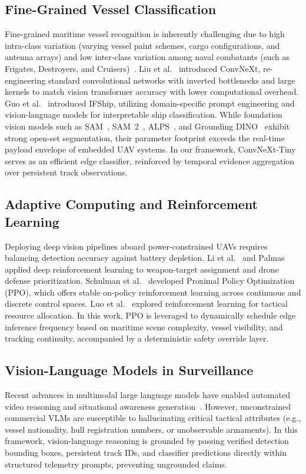 \documentclass[conference]{IEEEtran}
\begin{document}
\subsection{Fine-Grained Vessel Classification}
Fine-grained maritime vessel recognition is inherently challenging due to high intra-class variation (varying vessel paint schemes, cargo configurations, and antenna arrays) and low inter-class variation among naval combatants (such as Frigates, Destroyers, and Cruisers)~\cite{guo2026}. Liu et al.~\cite{liu2022convnet} introduced ConvNeXt, re-engineering standard convolutional networks with inverted bottlenecks and large kernels to match vision transformer accuracy with lower computational overhead. Guo et al.~\cite{guo2026} introduced IFShip, utilizing domain-specific prompt engineering and vision-language models for interpretable ship classification. While foundation vision models such as SAM~\cite{kirillov2023sam}, SAM~2~\cite{ravi2024sam2}, ALPS~\cite{zhang2025alps}, and Grounding DINO~\cite{liu2024groundingdino} exhibit strong open-set segmentation, their parameter footprint exceeds the real-time payload envelope of embedded UAV systems. In our framework, ConvNeXt-Tiny serves as an efficient edge classifier, reinforced by temporal evidence aggregation over persistent track observations.

\subsection{Adaptive Computing and Reinforcement Learning}
Deploying deep vision pipelines aboard power-constrained UAVs requires balancing detection accuracy against battery depletion. Li et al.~\cite{li2023drl} and Palmas~\cite{palmas2025} applied deep reinforcement learning to weapon-target assignment and drone defense prioritization. Schulman et al.~\cite{schulman2017ppo} developed Proximal Policy Optimization (PPO), which offers stable on-policy reinforcement learning across continuous and discrete control spaces. Luo et al.~\cite{luo2022} explored reinforcement learning for tactical resource allocation. In this work, PPO is leveraged to dynamically schedule edge inference frequency based on maritime scene complexity, vessel visibility, and tracking continuity, accompanied by a deterministic safety override layer.

\subsection{Vision-Language Models in Surveillance}
Recent advances in multimodal large language models have enabled automated video reasoning and situational awareness generation~\cite{desilva2024,feng2024}. However, unconstrained commercial VLMs are susceptible to hallucinating critical tactical attributes (e.g., vessel nationality, hull registration numbers, or unobservable armaments). In this framework, vision-language reasoning is grounded by passing verified detection bounding boxes, persistent track IDs, and classifier predictions directly within structured telemetry prompts, preventing ungrounded claims.
\end{document}
